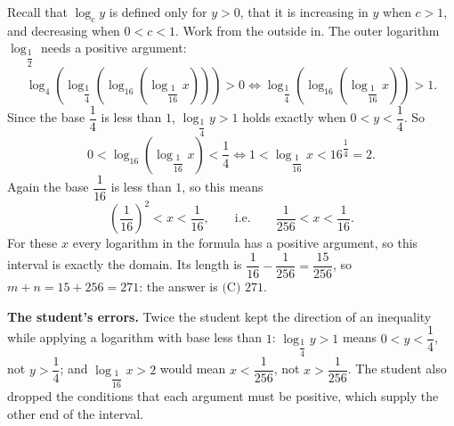 Recall that $\log_cy$ is defined only for $y>0$, that it is increasing in $y$ when $c>1$, and decreasing when $0<c<1$. Work from the outside in. The outer logarithm $\log_{\dfrac12}$ needs a positive argument:
\[\log_4\left(\log_{\dfrac14}\left(\log_{16}\left(\log_{\dfrac{1}{16}}x\right)\right)\right)>0\iff\log_{\dfrac14}\left(\log_{16}\left(\log_{\dfrac{1}{16}}x\right)\right)>1 .\]
Since the base $\dfrac14$ is less than $1$, $\log_{\dfrac14}y>1$ holds exactly when $0<y<\dfrac14$. So
\[0<\log_{16}\left(\log_{\dfrac{1}{16}}x\right)<\dfrac14\iff1<\log_{\dfrac{1}{16}}x<16^{\dfrac14}=2 .\]
Again the base $\dfrac{1}{16}$ is less than $1$, so this means
\[\left(\dfrac{1}{16}\right)^2<x<\dfrac{1}{16},\qquad\text{i.e.}\qquad\dfrac{1}{256}<x<\dfrac{1}{16}.\]
For these $x$ every logarithm in the formula has a positive argument, so this interval is exactly the domain. Its length is $\dfrac{1}{16}-\dfrac{1}{256}=\dfrac{15}{256}$, so $m+n=15+256=271$: the answer is $\boxed{\text{(C) }271}$.

\textbf{The student's errors.} Twice the student kept the direction of an inequality while applying a logarithm with base less than $1$: $\log_{\dfrac14}y>1$ means $0<y<\dfrac14$, not $y>\dfrac14$; and $\log_{\dfrac{1}{16}}x>2$ would mean $x<\dfrac{1}{256}$, not $x>\dfrac{1}{256}$. The student also dropped the conditions that each argument must be positive, which supply the other end of the interval.
